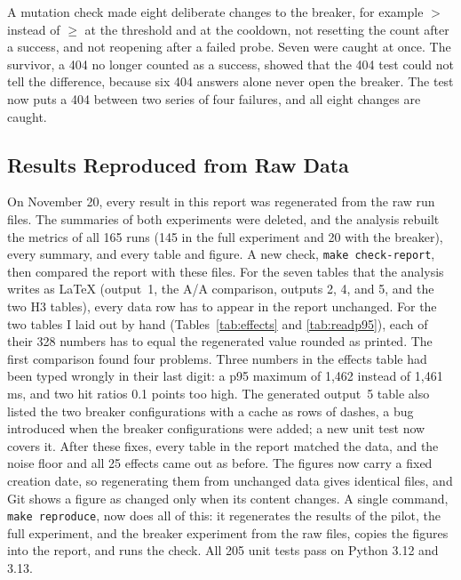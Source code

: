 \documentclass[10pt]{article}
\begin{document}
A mutation check made eight deliberate changes to the breaker, for example
$>$ instead of $\geq$ at the threshold and at the cooldown, not resetting the
count after a success, and not reopening after a failed probe. Seven were
caught at once. The survivor, a 404 no longer counted as a success, showed
that the 404 test could not tell the difference, because six 404 answers alone
never open the breaker. The test now puts a 404 between two series of four
failures, and all eight changes are caught.

\subsection{Results Reproduced from Raw Data}\label{sec:reproduced}
On November 20, every result in this report was regenerated from the raw run
files. The summaries of both experiments were deleted, and the analysis rebuilt
the metrics of all 165 runs (145 in the full experiment and 20 with the
breaker), every summary, and every table and figure. A new check,
\texttt{make check-report}, then compared the report with these files. For the
seven tables that the analysis writes as LaTeX (output~1, the A/A comparison,
outputs 2, 4, and 5, and the two H3 tables), every data row has to appear in
the report unchanged. For the two tables I laid out by hand
(Tables~\ref{tab:effects} and \ref{tab:readp95}), each of their 328 numbers has
to equal the regenerated value rounded as printed. The first comparison found
four problems. Three numbers in the effects table had been typed wrongly in
their last digit: a p95 maximum of 1{,}462 instead of 1{,}461\,ms, and two hit
ratios 0.1 points too high. The generated output~5 table also listed the two
breaker configurations with a cache as rows of dashes, a bug introduced when
the breaker configurations were added; a new unit test now covers it. After
these fixes, every table in the report matched the data, and the noise floor
and all 25 effects came out as before. The figures now carry a fixed creation
date, so regenerating them from unchanged data gives identical files, and Git
shows a figure as changed only when its content changes. A single command,
\texttt{make reproduce}, now does all of this: it regenerates the results of
the pilot, the full experiment, and the breaker experiment from the raw files,
copies the figures into the report, and runs the check. All 205 unit tests pass
on Python 3.12 and 3.13.
\end{document}

